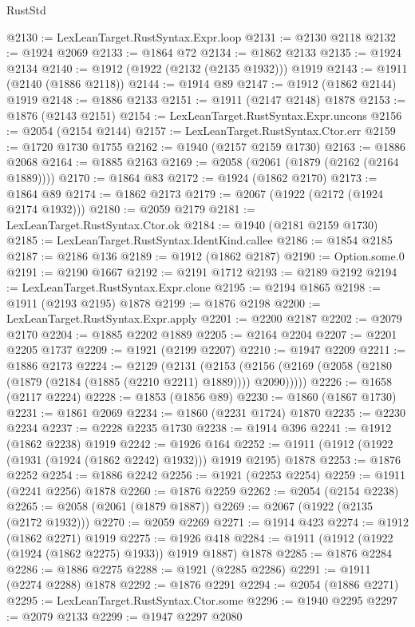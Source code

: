 \begin{lexlean}{RustStd}
\begin{coremodule}
{\begin{coremodule}
{{{{{{{{{{{{{{{{{{{{{{{{{{{{{@2130 := LexLeanTarget.RustSyntax.Expr.loop
@2131 := @2130 @2118
@2132 := @1924 @2069
@2133 := @1864 @72
@2134 := @1862 @2133
@2135 := @1924 @2134
@2140 := @1912 (@1922 (@2132 (@2135 @1932))) @1919
@2143 := @1911 (@2140 (@1886 @2118))
@2144 := @1914 @89
@2147 := @1912 (@1862 @2144) @1919
@2148 := @1886 @2133
@2151 := @1911 (@2147 @2148) @1878
@2153 := @1876 (@2143 @2151)
@2154 := LexLeanTarget.RustSyntax.Expr.uncons
@2156 := @2054 (@2154 @2144)
@2157 := LexLeanTarget.RustSyntax.Ctor.err
@2159 := @1720 @1730 @1755
@2162 := @1940 (@2157 @2159 @1730)
@2163 := @1886 @2068
@2164 := @1885 @2163
@2169 := @2058 (@2061 (@1879 (@2162 (@2164 @1889))))
@2170 := @1864 @83
@2172 := @1924 (@1862 @2170)
@2173 := @1864 @89
@2174 := @1862 @2173
@2179 := @2067 (@1922 (@2172 (@1924 @2174 @1932)))
@2180 := @2059 @2179
@2181 := LexLeanTarget.RustSyntax.Ctor.ok
@2184 := @1940 (@2181 @2159 @1730)
@2185 := LexLeanTarget.RustSyntax.IdentKind.callee
@2186 := @1854 @2185
@2187 := @2186 @136
@2189 := @1912 (@1862 @2187)
@2190 := Option.some.{0}
@2191 := @2190 @1667
@2192 := @2191 @1712
@2193 := @2189 @2192
@2194 := LexLeanTarget.RustSyntax.Expr.clone
@2195 := @2194 @1865
@2198 := @1911 (@2193 @2195) @1878
@2199 := @1876 @2198
@2200 := LexLeanTarget.RustSyntax.Expr.apply
@2201 := @2200 @2187
@2202 := @2079 @2170
@2204 := @1885 @2202 @1889
@2205 := @2164 @2204
@2207 := @2201 @2205 @1737
@2209 := @1921 (@2199 @2207)
@2210 := @1947 @2209
@2211 := @1886 @2173
@2224 := @2129
    (@2131
      (@2153 (@2156 (@2169 (@2058 (@2180 (@1879 (@2184 (@1885 (@2210 @2211) @1889)))) @2090)))))
@2226 := @1658 (@2117 @2224)
@2228 := @1853 (@1856 @89)
@2230 := @1860 (@1867 @1730)
@2231 := @1861 @2069
@2234 := @1860 (@2231 @1724) @1870
@2235 := @2230 @2234
@2237 := @2228 @2235 @1730
@2238 := @1914 @396
@2241 := @1912 (@1862 @2238) @1919
@2242 := @1926 @164
@2252 := @1911 (@1912 (@1922 (@1931 (@1924 (@1862 @2242) @1932))) @1919 @2195) @1878
@2253 := @1876 @2252
@2254 := @1886 @2242
@2256 := @1921 (@2253 @2254)
@2259 := @1911 (@2241 @2256) @1878
@2260 := @1876 @2259
@2262 := @2054 (@2154 @2238)
@2265 := @2058 (@2061 (@1879 @1887))
@2269 := @2067 (@1922 (@2135 (@2172 @1932)))
@2270 := @2059 @2269
@2271 := @1914 @423
@2274 := @1912 (@1862 @2271) @1919
@2275 := @1926 @418
@2284 := @1911 (@1912 (@1922 (@1924 (@1862 @2275) @1933)) @1919 @1887) @1878
@2285 := @1876 @2284
@2286 := @1886 @2275
@2288 := @1921 (@2285 @2286)
@2291 := @1911 (@2274 @2288) @1878
@2292 := @1876 @2291
@2294 := @2054 (@1886 @2271)
@2295 := LexLeanTarget.RustSyntax.Ctor.some
@2296 := @1940 @2295
@2297 := @2079 @2133
@2299 := @1947 @2297 @2080
}}}}}}}}}}}}}}}}}}}}}}}}}}}}}
\end{coremodule}}
\end{coremodule}
\end{lexlean}

